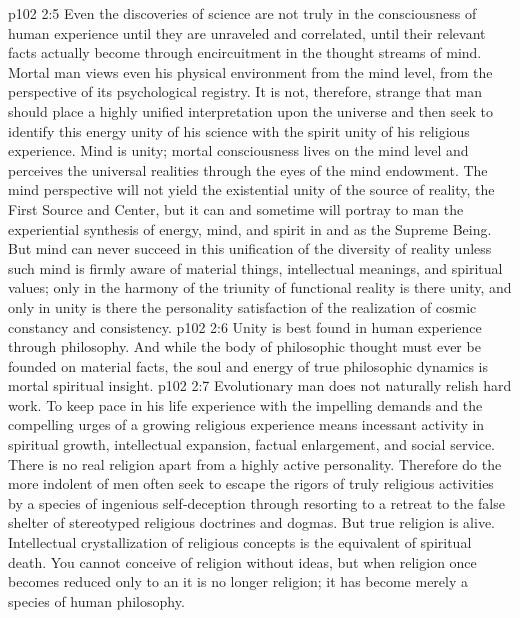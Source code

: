 \vs p102 2:5 Even the discoveries of science are not truly  in the consciousness of human experience until they are unraveled and correlated, until their relevant facts actually become  through encircuitment in the thought streams of mind. Mortal man views even his physical environment from the mind level, from the perspective of its psychological registry. It is not, therefore, strange that man should place a highly unified interpretation upon the universe and then seek to identify this energy unity of his science with the spirit unity of his religious experience. Mind is unity; mortal consciousness lives on the mind level and perceives the universal realities through the eyes of the mind endowment. The mind perspective will not yield the existential unity of the source of reality, the First Source and Center, but it can and sometime will portray to man the experiential synthesis of energy, mind, and spirit in and as the Supreme Being. But mind can never succeed in this unification of the diversity of reality unless such mind is firmly aware of material things, intellectual meanings, and spiritual values; only in the harmony of the triunity of functional reality is there unity, and only in unity is there the personality satisfaction of the realization of cosmic constancy and consistency.
\vs p102 2:6 Unity is best found in human experience through philosophy. And while the body of philosophic thought must ever be founded on material facts, the soul and energy of true philosophic dynamics is mortal spiritual insight.
\vs p102 2:7 \pc Evolutionary man does not naturally relish hard work. To keep pace in his life experience with the impelling demands and the compelling urges of a growing religious experience means incessant activity in spiritual growth, intellectual expansion, factual enlargement, and social service. There is no real religion apart from a highly active personality. Therefore do the more indolent of men often seek to escape the rigors of truly religious activities by a species of ingenious self\hyp{}deception through resorting to a retreat to the false shelter of stereotyped religious doctrines and dogmas. But true religion is alive. Intellectual crystallization of religious concepts is the equivalent of spiritual death. You cannot conceive of religion without ideas, but when religion once becomes reduced only to an  it is no longer religion; it has become merely a species of human philosophy.
